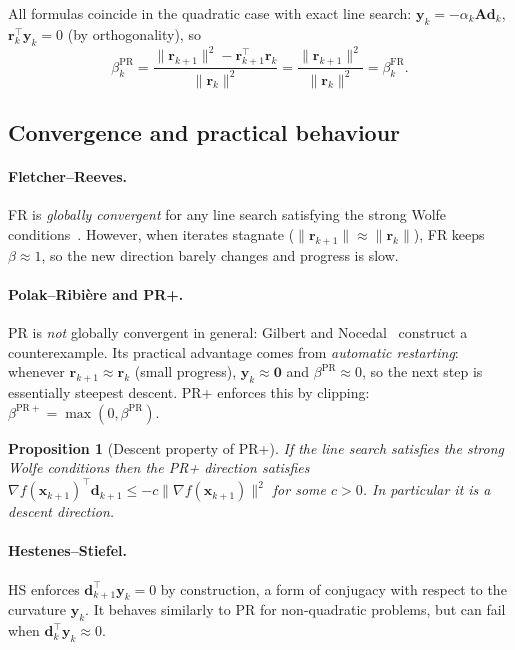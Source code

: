 \documentclass[11pt,a4paper]{article}
\newtheorem{proposition}[theorem]{Proposition}
\newcommand{\bA}{\mathbf{A}}
\newcommand{\br}{\mathbf{r}}
\newcommand{\bd}{\mathbf{d}}
\newcommand{\bx}{\mathbf{x}}
\newcommand{\by}{\mathbf{y}}
\newcommand{\bzero}{\mathbf{0}}
\newcommand{\norm}[1]{\|#1\|}
\newcommand{\tr}{\top}
\begin{document}
\noindent
All formulas coincide in the quadratic case with exact line search:
$\by_k = -\alpha_k\bA\bd_k$, $\br_k^\tr\by_k = 0$ (by orthogonality), so
\[
  \beta_k^{\mathrm{PR}} = \frac{\norm{\br_{k+1}}^2 - \br_{k+1}^\tr\br_k}{\norm{\br_k}^2}
  = \frac{\norm{\br_{k+1}}^2}{\norm{\br_k}^2} = \beta_k^{\mathrm{FR}}.
\]

\subsection{Convergence and practical behaviour}

\paragraph{Fletcher--Reeves.}
FR is \emph{globally convergent} for any line search satisfying the strong
Wolfe conditions~\cite{AlBaali1985,Zoutendijk1970}.  However, when iterates
stagnate ($\norm{\br_{k+1}} \approx \norm{\br_k}$), FR keeps $\beta \approx 1$,
so the new direction barely changes and progress is slow.

\paragraph{Polak--Ribi\`ere and PR+.}
PR is \emph{not} globally convergent in general:
Gilbert and Nocedal~\cite{GilNoc1992} construct a counterexample.
Its practical advantage comes from \emph{automatic restarting}: whenever
$\br_{k+1} \approx \br_k$ (small progress), $\by_k \approx \bzero$ and
$\beta^{\mathrm{PR}} \approx 0$, so the next step is essentially steepest descent.
PR+ enforces this by clipping: $\beta^{\mathrm{PR+}} = \max(0, \beta^{\mathrm{PR}})$.

\begin{proposition}[Descent property of PR+]
  If the line search satisfies the strong Wolfe conditions then the PR+ direction
  satisfies $\nabla f(\bx_{k+1})^\tr \bd_{k+1} \leq -c\norm{\nabla f(\bx_{k+1})}^2$
  for some $c > 0$.  In particular it is a descent direction.
\end{proposition}

\paragraph{Hestenes--Stiefel.}
HS enforces $\bd_{k+1}^\tr \by_k = 0$ by construction, a form of conjugacy with
respect to the curvature $\by_k$.  It behaves similarly to PR for non-quadratic
problems, but can fail when $\bd_k^\tr\by_k \approx 0$.
\end{document}
